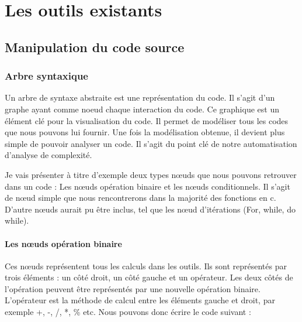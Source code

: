 \documentclass[12pt, twoside, openright]{report}
\begin{document}
\chapter{Les outils existants}


\section{Manipulation du code source}

\subsection{Arbre syntaxique}

Un arbre de syntaxe abstraite est une représentation du code. Il s'agit d'un graphe ayant comme noeud chaque interaction du code. Ce graphique est un élément clé pour la visualisation du code. Il permet de modéliser tous les codes que nous pouvons lui fournir. Une fois la modélisation obtenue, il devient plus simple de pouvoir analyser un code. Il s'agit du point clé de notre automatisation d'analyse de complexité.  

Je vais présenter à titre d'exemple deux types n\oe{}uds que nous pouvons retrouver dans un code : Les n\oe{}uds opération binaire et les n\oe{}uds conditionnels. Il s'agit de n\oe{}ud simple que nous rencontrerons dans la majorité des fonctions en c. D'autre n\oe{}uds aurait pu être inclus, tel que les n\oe{}ud d'itérations (For, while, do while).

\subsubsection{Les n\oe{}uds opération binaire}

Ces n\oe{}uds représentent tous les calculs dans les outils. Ils sont représentés par trois éléments : un côté droit, un côté gauche et un opérateur. Les deux côtés de l'opération peuvent être représentés par une nouvelle opération binaire. L'opérateur est la méthode de calcul entre les éléments gauche et droit, par exemple +, -, /, *, \% etc. Nous pouvons donc écrire le code suivant :
\end{document}
